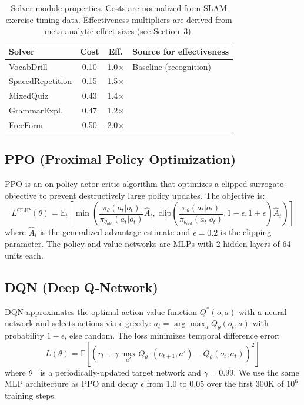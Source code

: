 \documentclass{article}
\begin{document}
\begin{table}[h]
\vspace{-0.5em}
\centering
\small
\caption{Solver module properties. Costs are normalized from SLAM exercise timing data. Effectiveness multipliers are derived from meta-analytic effect sizes (see Section~3).}
\label{tab:solvers}
\vspace{0.3em}
\begin{tabular}{@{}lccl@{}}
\toprule
Solver & Cost & Eff. & Source for effectiveness \\
\midrule
VocabDrill       & 0.10 & 1.0$\times$ & Baseline (recognition) \\
SpacedRepetition & 0.15 & 1.5$\times$ & \citet{cepeda2006spacing} \\
MixedQuiz        & 0.43 & 1.4$\times$ & \citet{rohrer2007interleaving} \\
GrammarExpl.     & 0.47 & 1.2$\times$ & \citet{spada2010explicit} \\
FreeForm         & 0.50 & 2.0$\times$ & \citet{roediger2006power} \\
\bottomrule
\end{tabular}
\vspace{-0.5em}
\end{table}

\subsection{PPO (Proximal Policy Optimization)}

PPO \citep{schulman2017ppo} is an on-policy actor-critic algorithm that optimizes a clipped surrogate objective to prevent destructively large policy updates. The objective is:
\begin{equation}
L^{\text{CLIP}}(\theta) = \mathbb{E}_t\!\left[\min\!\left(\frac{\pi_\theta(a_t|o_t)}{\pi_{\theta_{\text{old}}}(a_t|o_t)}\hat{A}_t,\; \text{clip}\!\left(\frac{\pi_\theta(a_t|o_t)}{\pi_{\theta_{\text{old}}}(a_t|o_t)}, 1\!-\!\epsilon, 1\!+\!\epsilon\right)\hat{A}_t\right)\right]
\end{equation}
where $\hat{A}_t$ is the generalized advantage estimate and $\epsilon=0.2$ is the clipping parameter. The policy and value networks are MLPs with 2 hidden layers of 64 units each.

\subsection{DQN (Deep Q-Network)}

DQN \citep{mnih2015dqn} approximates the optimal action-value function $Q^*(o,a)$ with a neural network and selects actions via $\epsilon$-greedy: $a_t = \arg\max_a Q_\theta(o_t, a)$ with probability $1-\epsilon$, else random. The loss minimizes temporal difference error:
\begin{equation}
L(\theta) = \mathbb{E}\!\left[(r_t + \gamma \max_{a'}Q_{\theta^-}(o_{t+1},a') - Q_\theta(o_t,a_t))^2\right]
\end{equation}
where $\theta^-$ is a periodically-updated target network and $\gamma = 0.99$. We use the same MLP architecture as PPO and decay $\epsilon$ from 1.0 to 0.05 over the first 300K of $10^6$ training steps.
\end{document}

